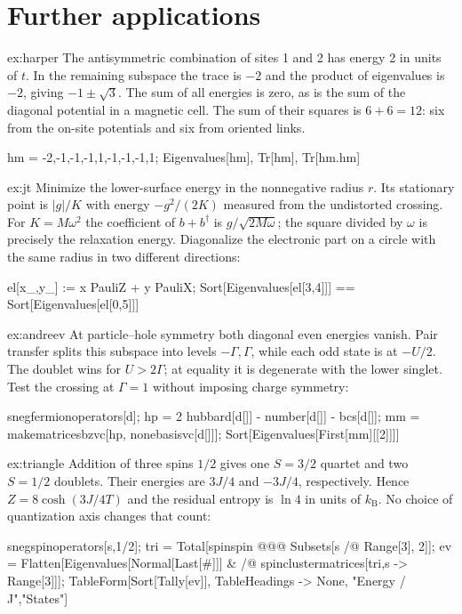 \section*{Further applications}
\begin{solution}{ex:harper}
The antisymmetric combination of sites 1 and 2 has energy 2 in
units of $t$. In the remaining subspace the trace is $-2$ and the
product of eigenvalues is $-2$, giving $-1\pm\sqrt3$. The sum of
all energies is zero, as is the sum of the diagonal potential in a
magnetic cell. The sum of their squares is $6+6=12$: six from the
on-site potentials and six from oriented links.
\begin{wl}
hm = {{-2,-1,-1},{-1,1,-1},{-1,-1,1}};
{Eigenvalues[hm], Tr[hm], Tr[hm.hm]}
\end{wl}
\end{solution}
\begin{solution}{ex:jt}
Minimize the lower-surface energy in the nonnegative radius $r$.
Its stationary point is $|g|/K$ with energy $-g^2/(2K)$ measured
from the undistorted crossing. For $K=M\omega^2$ the coefficient
of $b+b^\dagger$ is $g/\sqrt{2M\omega}$; the square divided by
$\omega$ is precisely the relaxation energy. Diagonalize the electronic
part on a circle with the same radius in two different directions:
\begin{wl}
el[x_,y_] := x PauliZ + y PauliX;
Sort[Eigenvalues[el[3,4]]] == Sort[Eigenvalues[el[0,5]]]
\end{wl}
\end{solution}
\begin{solution}{ex:andreev}
At particle--hole symmetry both diagonal even energies vanish.
Pair transfer splits this subspace into levels $-\Gamma,\Gamma$,
while each odd state is at $-U/2$. The doublet wins for $U>2\Gamma$;
at equality it is degenerate with the lower singlet. Test the crossing
at $\Gamma=1$ without imposing charge symmetry:
\begin{wl}
snegfermionoperators[d];
hp = 2 hubbard[d[]] - number[d[]] - bcs[d[]];
mm = makematricesbzvc[hp, nonebasisvc[{d[]}]];
Sort[Eigenvalues[First[mm][[2]]]]
\end{wl}
\end{solution}
\begin{solution}{ex:triangle}
Addition of three spins $1/2$ gives one $S=3/2$ quartet and two
$S=1/2$ doublets. Their energies are $3J/4$ and $-3J/4$, respectively.
Hence $Z=8\cosh(3J/4T)$ and the residual entropy is $\ln4$ in units
of $k_{\mathrm B}$. No choice of quantization axis changes that count:
\begin{wl}
snegspinoperators[{s,1/2}];
tri = Total[spinspin @@@ Subsets[s /@ Range[3], {2}]];
ev = Flatten[Eigenvalues[Normal[Last[#]]] & /@
  spinclustermatrices[tri,{s -> Range[3]}]];
TableForm[Sort[Tally[ev]], TableHeadings -> {None, {"Energy / J","States"}}]
\end{wl}
\end{solution}
